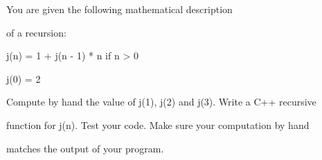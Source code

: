 You are given the following mathematical description

of a recursion:



j(n) = 1 + j(n - 1) * n if n > 0



j(0) = 2



Compute by hand the value of j(1), j(2) and j(3). Write a C++ recursive

function for j(n). Test your code. Make sure your computation by hand

matches the output of your program.

